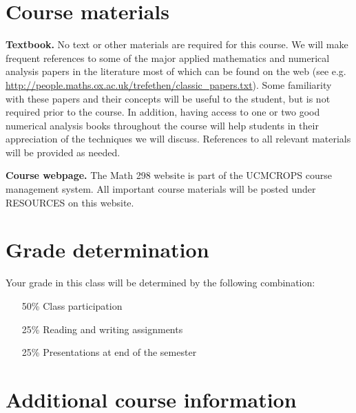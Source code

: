 \documentclass[11pt]{article}
\begin{document}
\section*{Course materials}

\begin{description}

\item {\bf Textbook.} No text or other materials are required for this course.  We will make frequent references to some of the major applied mathematics and numerical analysis papers in the literature most of which can be found on the web (see e.g. \url{http://people.maths.ox.ac.uk/trefethen/classic_papers.txt}).  Some familiarity with these papers and their concepts will be useful to the student, but is not required prior to the course.  In addition, having access to one or two good numerical analysis books throughout the course will help students in their appreciation of the techniques we will discuss.  References to all relevant materials will be provided as needed.

\item {\bf Course webpage.} The Math 298 website is part of the
  UCMCROPS course management system. All important course materials
  will be posted under RESOURCES on this website.

\end{description}

\section*{Grade determination} 

\begin{description}

\item Your grade in this class will be determined by the following combination:

\begin{itemize}
\item[50\%]  Class participation
\item[25\%]  Reading and writing assignments
\item[25\%]  Presentations at end of the semester
\end{itemize}

\end{description}

\section*{Additional course information}
\end{document}
